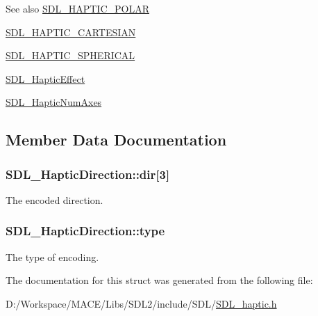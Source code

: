 \begin{DoxySeeAlso}{See also}
\hyperlink{_s_d_l__haptic_8h_acdc35e97e5525472054a67b76e518f3b}{S\+D\+L\+\_\+\+H\+A\+P\+T\+I\+C\+\_\+\+P\+O\+L\+AR} 

\hyperlink{_s_d_l__haptic_8h_af8b2430a363a968de2a5b64c8f663d3b}{S\+D\+L\+\_\+\+H\+A\+P\+T\+I\+C\+\_\+\+C\+A\+R\+T\+E\+S\+I\+AN} 

\hyperlink{_s_d_l__haptic_8h_a1fcf7cb0eaf3c39b16ba266054e25aff}{S\+D\+L\+\_\+\+H\+A\+P\+T\+I\+C\+\_\+\+S\+P\+H\+E\+R\+I\+C\+AL} 

\hyperlink{union_s_d_l___haptic_effect}{S\+D\+L\+\_\+\+Haptic\+Effect} 

\hyperlink{_s_d_l__haptic_8h_ad6705645197f6df4eeeea32392462483}{S\+D\+L\+\_\+\+Haptic\+Num\+Axes} 
\end{DoxySeeAlso}


\subsection{Member Data Documentation}
\subsubsection[{\texorpdfstring{dir}{dir}}]{ S\+D\+L\+\_\+\+Haptic\+Direction\+::dir\mbox{[}3\mbox{]}}\hypertarget{struct_s_d_l___haptic_direction_a6cebd8118a3e61e36bd0c503ae020362}{}\label{struct_s_d_l___haptic_direction_a6cebd8118a3e61e36bd0c503ae020362}
The encoded direction. 
\subsubsection[{\texorpdfstring{type}{type}}]{ S\+D\+L\+\_\+\+Haptic\+Direction\+::type}\hypertarget{struct_s_d_l___haptic_direction_acd6830ad68c4ba2af16057fa418087cc}{}\label{struct_s_d_l___haptic_direction_acd6830ad68c4ba2af16057fa418087cc}
The type of encoding. 

The documentation for this struct was generated from the following file\+:\begin{DoxyCompactItemize}
\item 
D\+:/\+Workspace/\+M\+A\+C\+E/\+Libs/\+S\+D\+L2/include/\+S\+D\+L/\hyperlink{_s_d_l__haptic_8h}{S\+D\+L\+\_\+haptic.\+h}\end{DoxyCompactItemize}
